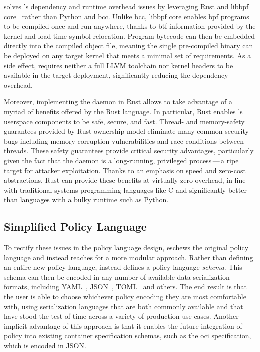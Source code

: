 \begin{inprogress}
\bpfcontain{} solves \bpfbox{}'s dependency and runtime overhead issues by leveraging Rust
and libbpf \gls{core}~\cite{nakryiko2020_core} rather than Python and bcc.  Unlike bcc,
libbpf \gls{core} enables \gls{bpf} programs to be compiled once and run anywhere, thanks
to \gls{btf} information provided by the kernel and load-time symbol relocation. Program
bytecode can then be embedded directly into the compiled object file, meaning the single
pre-compiled \bpfcontain{} binary can be deployed on any target kernel that meets
a minimal set of requirements. As a side effect, \bpfcontain{} requires neither a full
LLVM toolchain nor kernel headers to be available in the target deployment, significantly
reducing the dependency overhead.

Moreover, implementing the \bpfcontain{} daemon in Rust allows \bpfcontain{} to take
advantage of a myriad of benefits offered by the Rust language. In particular, Rust
enables \bpfcontain{}'s userspace components to be safe, secure, and fast. Thread- and
memory-safety guarantees provided by Rust ownership model eliminate many common security
bugs including memory corruption vulnerabilities and race conditions between threads.
These safety guarantees provide critical security advantages, particularly given the fact
that the \bpfcontain{} daemon is a long-running, privileged process\,---\,a ripe target
for attacker exploitation. Thanks to an emphasis on speed and zero-cost abstractions, Rust
can provide these benefits at virtually zero overhead, in line with traditional systems
programming languages like C and significantly better than languages with a bulky runtime
such as Python.
\end{inprogress}

\subsection{Simplified Policy Language}%
\label{ss:bpfcontain-simplified}

\begin{inprogress}
To rectify these issues in the policy language design, \bpfcontain{} eschews the original
policy language and instead reaches for a more modular approach.  Rather than defining an
entire new policy language, \bpfcontain{} instead defines a policy language
\textit{schema}. This schema can then be encoded in any number of available data
serialization formats, including YAML~, JSON~, TOML~ and
others. The end result is that the user is able to choose whichever policy encoding they
are most comfortable with, using serialization languages that are both commonly available
and that have stood the test of time across a variety of production use cases. Another
implicit advantage of this approach is that it enables the future integration of
\bpfcontain{} policy into existing container specification schemas, such as the \gls{oci}
specification, which is encoded in JSON\@.
\end{inprogress}


